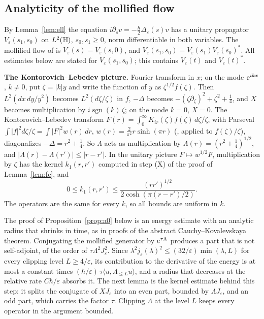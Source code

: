 \subsection{Analyticity of the mollified flow}\label{app:kl}
By Lemma~\ref{lem:ell} the equation $i\partial_sv=-\tfrac\hbar2\Delta_\varepsilon(s)v$ has a unitary propagator
$V_\varepsilon(s_1,s_0)$ on $L^2(\mathbb{H})$, $s_0,s_1\ge0$, norm differentiable in both variables. The mollified flow of
\cite[(4.32)--(4.33)]{S} is $V_\varepsilon(s)=V_\varepsilon(s,0)$, and $V_\varepsilon(s_1,s_0)=V_\varepsilon(s_1)V_\varepsilon(s_0)^*$.
All estimates below are stated for $V_\varepsilon(s_1,s_0)$; this contains $V_\varepsilon(t)$ and $V_\varepsilon(t)^*$.

\medskip\noindent\textbf{The Kontorovich--Lebedev picture.}
Fourier transform in $x$; on the mode $\mathrm{e}^{ikx}$, $k\ne0$, put $\zeta=|k|y$ and write the function of $y$ as $\zeta^{1/2}f(\zeta)$. Then
$L^2(dx\,dy/y^2)$ becomes $L^2(d\zeta/\zeta)$ in $f$, $-\Delta$ becomes $-(\zeta\partial_\zeta)^2+\zeta^2+\tfrac14$, and $X$ becomes multiplication by
$i\operatorname{sgn}(k)\,\zeta$; on the mode $k=0$, $X=0$. The Kontorovich--Lebedev transform $F(r)=\int_0^\infty K_{ir}(\zeta)f(\zeta)\,d\zeta/\zeta$, with Parseval
$\int|f|^2d\zeta/\zeta=\int|F|^2w(r)\,dr$, $w(r)=\tfrac2{\pi^2}r\sinh(\pi r)$ (\cite[eqs.~(1.1)--(1.3)]{Y}, applied to $f(\zeta)/\zeta$), diagonalizes
$-\Delta=r^2+\tfrac14$. So $\Lambda$ acts as multiplication by $\Lambda(r)=(r^2+\tfrac14)^{1/2}$, and
$|\Lambda(r)-\Lambda(r')|\le|r-r'|$. In the unitary picture $F\mapsto w^{1/2}F$, multiplication by $\zeta$ has the kernel
$k_1(r,r')$ computed in step (X) of the proof of Lemma~\ref{lem:fc}, and
\begin{equation}\label{eq:zt1}
0\le k_1(r,r')\le\frac{(rr')^{1/2}}{2\cosh(\pi(r-r')/2)} .
\end{equation}
The operators are the same for every $k$, so all bounds are uniform in $k$.

The proof of Proposition~\ref{prop:a0} below is an energy estimate with an analytic radius that shrinks in time, as in proofs of
the abstract Cauchy--Kovalevskaya theorem. Conjugating the mollified generator by $\mathrm{e}^{\tau\Lambda}$ produces a part that is not
self-adjoint, of the order of $\tau\Lambda^2J_\varepsilon^2$. Since $\lambda^2j_\varepsilon(\lambda)^2\le(32/\varepsilon)\min(\lambda,L)$ for
every clipping level $L\ge4/\varepsilon$,
its contribution to the derivative of the energy is at most a constant times $(\hbar/\varepsilon)\,\tau\langle u,\Lambda_{\le L}u\rangle$,
and a radius that decreases at the relative rate $C\hbar/\varepsilon$ absorbs it.
The next lemma is the kernel estimate behind this step: it splits the conjugate of $XJ_\varepsilon$ into an even part, bounded by
$\Lambda J_\varepsilon$, and an odd part, which carries the factor $\tau$. Clipping $\Lambda$ at the level $L$ keeps every operator in
the argument bounded.

